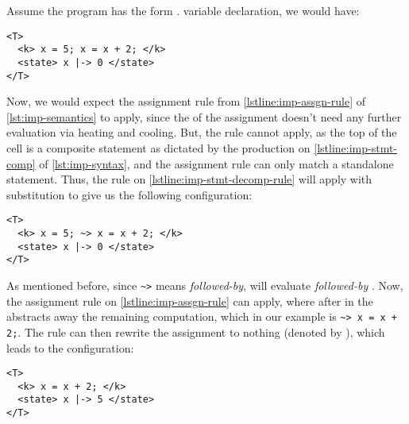 Assume the program has the form .
variable declaration, we would have:
\newpage
\begin{lstlisting}[language=k,style=ksty,frame=single]
<T>
  <k> x = 5; x = x + 2; </k>
  <state> x |-> 0 </state>
</T>
\end{lstlisting}
Now, we would expect the assignment rule from \autoref{lstline:imp-assgn-rule}
of \autoref{lst:imp-semantics} to apply, since the \RHS{} of
the assignment  doesn't need any further
evaluation via heating and cooling.
But, the rule cannot apply, as the top of the  cell
is a composite statement as dictated by the production on
\autoref{lstline:imp-stmt-comp} of \autoref{lst:imp-syntax},
and the assignment rule can
only match a standalone statement. Thus, the rule on
\autoref{lstline:imp-stmt-decomp-rule} will apply with
substitution
to give us the following configuration:
\begin{lstlisting}[language=k,style=ksty,frame=single]
<T>
  <k> x = 5; ~> x = x + 2; </k>
  <state> x |-> 0 </state>
</T>
\end{lstlisting}
As mentioned before, since \lstinline[style=ksty]{~>} means
\emph{followed-by}, \K{} will evaluate 
\emph{followed-by} . Now, the assignment
rule on \autoref{lstline:imp-assgn-rule} can apply,
where  after  in the 
abstracts away the remaining computation, which in our example
is \lstinline[style=ksty]{~> x = x + 2;}. The rule can then
rewrite the assignment  to nothing (denoted by
), which leads to the configuration:
\begin{lstlisting}[language=k,style=ksty,frame=single]
<T>
  <k> x = x + 2; </k>
  <state> x |-> 5 </state>
</T>
\end{lstlisting}

